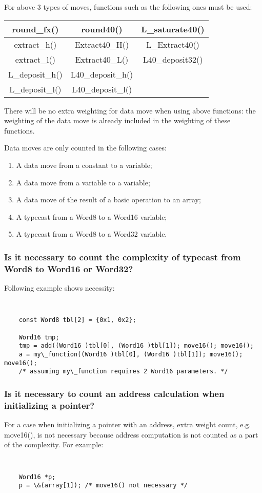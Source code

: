 For above 3 types of moves, functions such as the following ones
must be used:
\begin{center}
    \begin{tabular}{|c|c|c|}
        \hline
        \hline round\_fx() & round40()   & L\_saturate40()\\
        \hline extract\_h() & Extract40\_H()   & L\_Extract40()\\
        \hline extract\_l() & Extract40\_L()   & L40\_deposit32()\\
        \hline L\_deposit\_h()   & L40\_deposit\_h() & \\
        \hline L\_deposit\_l()   & L40\_deposit\_l() & \\
        \hline
    \end{tabular}
\end{center}

There will be no extra weighting for data move when using above
functions: the weighting of the data move is already included in
the weighting of these functions.

Data moves are only counted in
the following cases:
\begin{enumerate}
    \item A data move from a constant to a variable;
    \item A data move from a variable to a variable;
    \item A data move of the result of a basic operation to an array;
    \item A typecast from a Word8 to a Word16 variable;
    \item A typecast from a Word8 to a Word32 variable.
\end{enumerate}

\subsubsection{Is it necessary to count the complexity of typecast
from Word8 to Word16 or Word32?}
Following example shows necessity:
{\tt\small
\begin{verbatim}
    const Word8 tbl[2] = {0x1, 0x2};

    Word16 tmp;
    tmp = add((Word16 )tbl[0], (Word16 )tbl[1]); move16(); move16();
    a = my\_function((Word16 )tbl[0], (Word16 )tbl[1]); move16(); move16();
    /* assuming my\_function requires 2 Word16 parameters. */
\end{verbatim}
}

\subsubsection{Is it necessary to count an address calculation when initializing a pointer?}
For a case when initializing a pointer with an address, extra weight
count, e.g. move16(), is not necessary because address computation is
not counted as a part of the complexity. For example:
{\tt\small
\begin{verbatim}
    Word16 *p;
    p = \&(array[1]); /* move16() not necessary */
\end{verbatim}
}%

